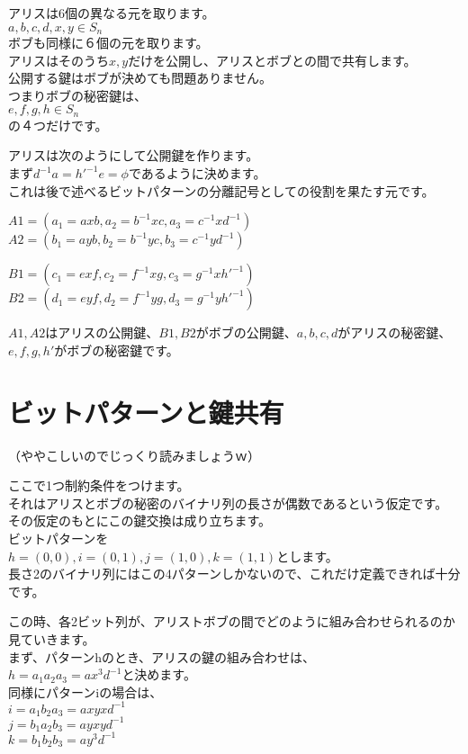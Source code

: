 \documentclass[
]{article}
\begin{document}
アリスは6個の異なる元を取ります。\\
\(a,b,c,d,x,y \in S_n\)\\
ボブも同様に６個の元を取ります。\\
アリスはそのうち\(x,y\)だけを公開し、アリスとボブとの間で共有します。\\
公開する鍵はボブが決めても問題ありません。\\
つまりボブの秘密鍵は、\\
\(e,f,g,h \in S_n\)\\
の４つだけです。

アリスは次のようにして公開鍵を作ります。\\
まず\(d^{-1}a=h'^{-1}e=\phi\)であるように決めます。\\
これは後で述べるビットパターンの分離記号としての役割を果たす元です。

\(A1=(a_1=axb,a_2=b^{-1}xc,a_3=c^{-1}xd^{-1})\)\\
\(A2=(b_1=ayb,b_2=b^{-1}yc,b_3=c^{-1}yd^{-1})\)

\(B1=(c_1=exf,c_2=f^{-1}xg,c_3=g^{-1}xh'^{-1})\)\\
\(B2=(d_1=eyf,d_2=f^{-1}yg,d_3=g^{-1}y h'^{-1})\)

\(A1,A2\)はアリスの公開鍵、\(B1,B2\)がボブの公開鍵、\(a,b,c,d\)がアリスの秘密鍵、\(e,f,g,h'\)がボブの秘密鍵です。

\hypertarget{ux30d3ux30c3ux30c8ux30d1ux30bfux30fcux30f3ux3068ux9375ux5171ux6709}{%
\section{ビットパターンと鍵共有}\label{ux30d3ux30c3ux30c8ux30d1ux30bfux30fcux30f3ux3068ux9375ux5171ux6709}}

（ややこしいのでじっくり読みましょうｗ）

ここで1つ制約条件をつけます。\\
それはアリスとボブの秘密のバイナリ列の長さが偶数であるという仮定です。\\
その仮定のもとにこの鍵交換は成り立ちます。\\
ビットパターンを\\
\(h=(0,0),i=(0,1),j=(1,0),k=(1,1)\)とします。\\
長さ2のバイナリ列にはこの4パターンしかないので、これだけ定義できれば十分です。

この時、各2ビット列が、アリストボブの間でどのように組み合わせられるのか見ていきます。\\
まず、パターンhのとき、アリスの鍵の組み合わせは、\\
\(h=a_1a_2a_3=ax^3d^{-1}\)と決めます。\\
同様にパターンiの場合は、\\
\(i=a_1b_2a_3=axyxd^{-1}\)\\
\(j=b_1a_2b_3=ayxyd^{-1}\)\\
\(k=b_1b_2b_3=ay^3d^{-1}\)
\end{document}
